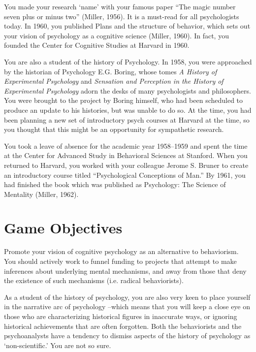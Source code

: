 \begin{refsection}
You made your research ‘name’ with your famous paper “The magic number seven plus or minus two” (Miller, 1956). It is a must-read for all psychologists today. In 1960, you published Plans and the structure of behavior, which sets out your vision of psychology as a cognitive science (Miller, 1960). In fact, you founded the Center for Cognitive Studies at Harvard in 1960.

You are also a student of the history of Psychology. In 1958, you were approached by the historian of Psychology E.G. Boring, whose tomes \emph{A History of Experimental Psychology} and \emph{Sensation and Perception in the History of Experimental Psychology} adorn the desks of many psychologists and philosophers. You were brought to the project by Boring himself, who had been scheduled to produce an update to his histories, but was unable to do so. At the time, you had been planning a new set of introductory psych courses at Harvard at the time, so you thought that this might be an opportunity for sympathetic research.

You took a leave of absence for the academic year 1958--1959 and spent the time at the Center for Advanced Study in Behavioral Sciences at Stanford. When you returned to Harvard, you worked with your colleague Jerome S. Bruner to create an introductory course titled “Psychological Conceptions of Man.” By 1961, you had finished the book which was published as Psychology: The Science of Mentality (Miller, 1962).

\section{Game Objectives}
\label{gameobjectives}

Promote your vision of cognitive psychology as an alternative to behaviorism. You should actively work to funnel funding to projects that attempt to make inferences about underlying mental mechanisms, and away from those that deny the existence of such mechanisms (i.e. radical behaviorists).

As a student of the history of psychology, you are also very keen to place yourself in the narrative arc of psychology –which means that you will keep a close eye on those who are characterizing historical figures in inaccurate ways, or ignoring historical achievements that are often forgotten. Both the behaviorists and the psychoanalysts have a tendency to dismiss aspects of the history of psychology as `non-scientific.' You are not so sure.


\end{refsection}
